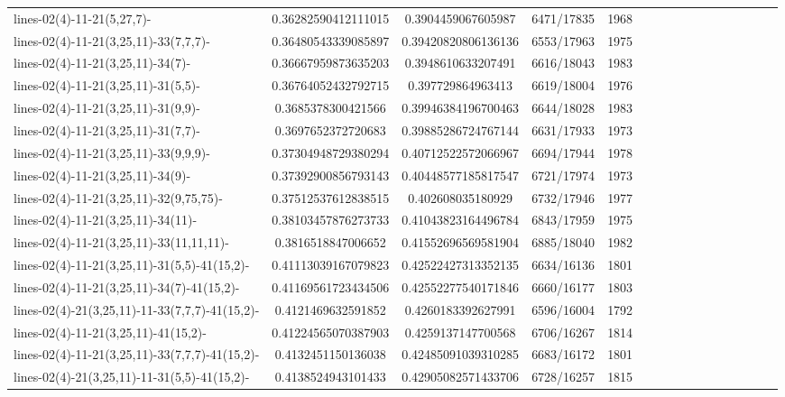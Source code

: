 \documentclass[12pt]{report}			%
\begin{document}
\begin{landscape}
\begin{longtable}{ | p{5cm} | *{15}{c|}}
lines-02(4)-11-21(5,27,7)-                        & 0.36282590412111015 & 0.3904459067605987  & 6471/17835  & 1968 \\
lines-02(4)-11-21(3,25,11)-33(7,7,7)-            & 0.36480543339085897 & 0.39420820806136136 & 6553/17963  & 1975 \\
lines-02(4)-11-21(3,25,11)-34(7)-                 & 0.36667959873635203 & 0.3948610633207491  & 6616/18043  & 1983 \\
lines-02(4)-11-21(3,25,11)-31(5,5)-               & 0.36764052432792715 & 0.397729864963413   & 6619/18004  & 1976 \\
lines-02(4)-11-21(3,25,11)-31(9,9)-               & 0.3685378300421566  & 0.39946384196700463 & 6644/18028  & 1983 \\
lines-02(4)-11-21(3,25,11)-31(7,7)-               & 0.3697652372720683  & 0.39885286724767144 & 6631/17933  & 1973 \\
lines-02(4)-11-21(3,25,11)-33(9,9,9)-             & 0.37304948729380294 & 0.40712522572066967 & 6694/17944  & 1978 \\
lines-02(4)-11-21(3,25,11)-34(9)-                 & 0.37392900856793143 & 0.40448577185817547 & 6721/17974  & 1973 \\
lines-02(4)-11-21(3,25,11)-32(9,75,75)-           & 0.37512537612838515 & 0.402608035180929   & 6732/17946  & 1977 \\
lines-02(4)-11-21(3,25,11)-34(11)-                & 0.38103457876273733 & 0.41043823164496784 & 6843/17959  & 1975 \\
lines-02(4)-11-21(3,25,11)-33(11,11,11)-           & 0.3816518847006652  & 0.41552696569581904 & 6885/18040  & 1982 \\
lines-02(4)-11-21(3,25,11)-31(5,5)-41(15,2)-      & 0.41113039167079823 & 0.42522427313352135 & 6634/16136  & 1801 \\
lines-02(4)-11-21(3,25,11)-34(7)-41(15,2)-        & 0.41169561723434506 & 0.42552277540171846 & 6660/16177  & 1803 \\
lines-02(4)-21(3,25,11)-11-33(7,7,7)-41(15,2)-   & 0.4121469632591852  & 0.4260183392627991  & 6596/16004  & 1792 \\
lines-02(4)-11-21(3,25,11)-41(15,2)-              & 0.41224565070387903 & 0.4259137147700568  & 6706/16267  & 1814 \\
lines-02(4)-11-21(3,25,11)-33(7,7,7)-41(15,2)-   & 0.4132451150136038  & 0.42485091039310285 & 6683/16172  & 1801 \\
lines-02(4)-21(3,25,11)-11-31(5,5)-41(15,2)-      & 0.4138524943101433  & 0.42905082571433706 & 6728/16257  & 1815 \\

\end{longtable}
\end{landscape}
\end{document}
